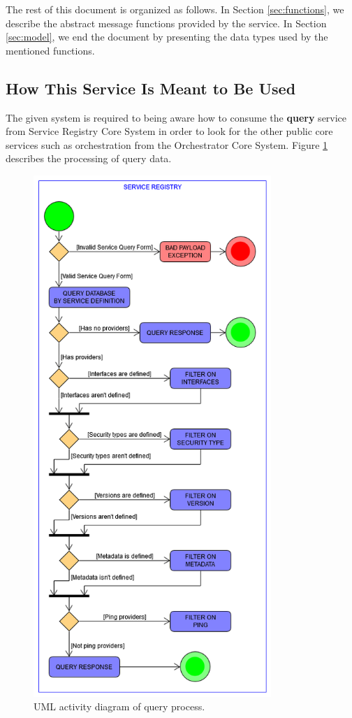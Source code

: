\documentclass[a4paper]{arrowhead}
\begin{document}
The rest of this document is organized as follows.
In Section \ref{sec:functions}, we describe the abstract message functions provided by the service.
In Section \ref{sec:model}, we end the document by presenting the data types used by the mentioned functions.

\newpage

\subsection{How This Service Is Meant to Be Used}
The given system is required to being aware how to consume the \textbf{query} service from Service Registry Core System in order to look for the other public core services such as orchestration from the Orchestrator Core System. Figure \ref{fig:activity_uml} describes the processing of query data.

\begin{figure}[h!]
  \centering
  \includegraphics[width=9cm]
  {figures/post_service_registry_query_activity_uml}
  \caption{
    UML activity diagram of query process.
  }
  \label{fig:activity_uml}
\end{figure}
\end{document}
